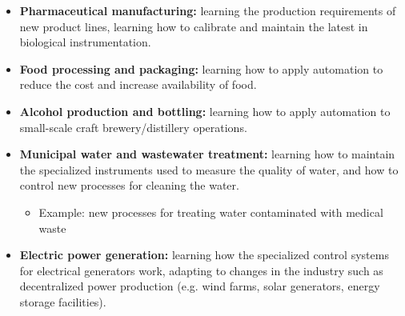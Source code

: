 \begin{itemize}
\begin{itemize}
\item{} Example: hazardous materials extraction (e.g. anhydrous ammonia, hydrogen sulfide)
\end{itemize}
\item{} {\bf Pharmaceutical manufacturing:} learning the production requirements of new product lines, learning how to calibrate and maintain the latest in biological instrumentation.  

\item{} {\bf Food processing and packaging:} learning how to apply automation to reduce the cost and increase availability of food.

\item{} {\bf Alcohol production and bottling:} learning how to apply automation to small-scale craft brewery/distillery operations.

\item{} {\bf Municipal water and wastewater treatment:} learning how to maintain the specialized instruments used to measure the quality of water, and how to control new processes for cleaning the water.
\begin{itemize}

\item{} Example: new processes for treating water contaminated with medical waste
\end{itemize}
\item{} {\bf Electric power generation:} learning how the specialized control systems for electrical generators work, adapting to changes in the industry such as decentralized power production (e.g. wind farms, solar generators, energy storage facilities).
\begin{itemize}


\end{itemize}
\end{itemize}
